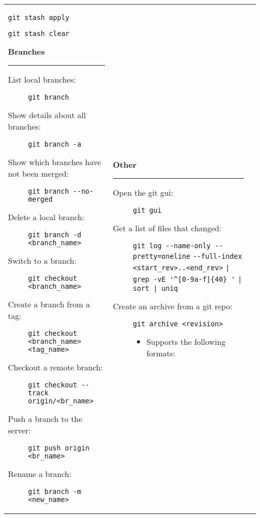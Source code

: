 \documentclass[landscape]{article}
\begin{document}
\begin{tabular*}{10.5in}{|p{2.9in}|p{2.9in}|p{2.9in}|}
\begin{flushleft}
\begin{description}
                {\verb!git stash apply!}
            \item[Clear the stash:]
                {\verb!git stash clear!}
        \end{description}
        \textbf{\large{Branches}}
        \rule{2.9in}{.5pt}
        \small
        \begin{description}
            \item[List local branches:]
                {\verb!git branch!}
            \item[Show details about all branches:]
                {\verb!git branch -a!}
            \item[Show which branches have not been merged:]
                {\verb!git branch --no-merged!}
            \item[Delete a local branch:]
                {\verb!git branch -d <branch_name>!}
            \item[Switch to a branch:]
                {\verb!git checkout <branch_name>!}
            \item[Create a branch from a tag:]
                {\verb!git checkout <branch_name> <tag_name>!}
            \item[Checkout a remote branch:]
                {\verb!git checkout --track origin/<br_name>!}
            \item[Push a branch to the server:]
                {\verb!git push origin <br_name>!}
            \item[Rename a branch:]
                {\verb!git branch -m <new_name>!}
        \end{description}
    \end{flushleft}
    &
    \begin{flushleft}
        \textbf{\large{Other}}
        \rule{2.9in}{.5pt}
        \small
        \begin{description}
            \item[Open the git gui:]
                {\verb!git gui!}
            \item[Get a list of files that changed:]
                {\verb!git log --name-only --pretty=oneline!
                 \verb!--full-index <start_rev>..<end_rev>!
                 \verb!| grep -vE '^[0-9a-f]{40} '!
                 \verb!| sort | uniq!}
             \item[Create an archive from a git repo:]
                 {\verb!git archive <revision>!}
                 \begin{itemize}
                     \item{Supports the following formats:}

\end{itemize}
\end{description}
\end{flushleft}
\end{tabular*}
\end{document}
